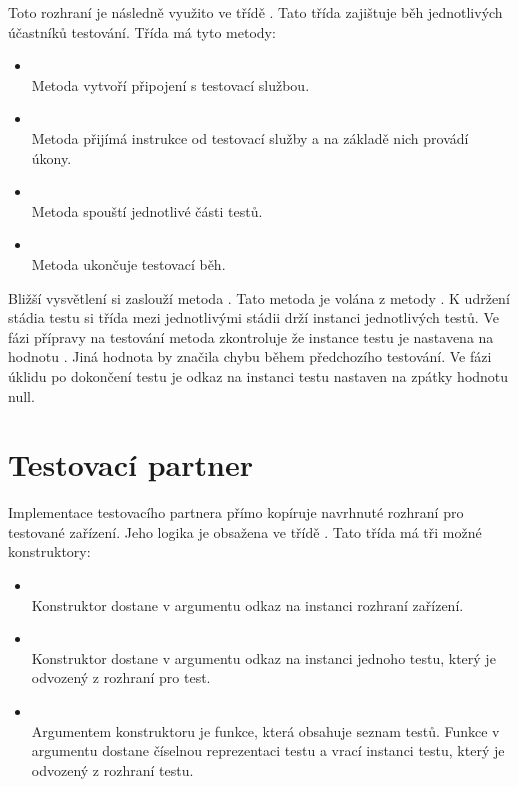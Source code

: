 Toto rozhraní je následně využito ve třídě . Tato třída zajištuje běh jednotlivých účastníků testování. Třída má tyto metody:

\begin{itemize}
    \item {} \\ Metoda vytvoří připojení s testovací službou.
    \item {} \\ Metoda přijímá instrukce od testovací služby a na základě nich provádí úkony.
    \item {} \\ Metoda spouští jednotlivé části testů. 
    \item {} \\ Metoda ukončuje testovací běh.
\end{itemize}

Bližší vysvětlení si zaslouží metoda . Tato metoda je volána z metody . K udržení stádia testu si třída mezi jednotlivými stádii drží instanci jednotlivých testů. Ve fázi přípravy na testování metoda zkontroluje že instance testu je nastavena na hodnotu . Jiná hodnota by značila chybu během předchozího testování. Ve fázi úklidu po dokončení testu je odkaz na instanci testu nastaven na zpátky hodnotu null. 

\section{Testovací partner}
Implementace testovacího partnera přímo kopíruje navrhnuté rozhraní pro testované zařízení. Jeho logika je obsažena ve třídě . Tato třída má tři možné konstruktory:

\begin{itemize} 
    \item {} \\
    Konstruktor dostane v argumentu odkaz na instanci rozhraní zařízení.
    \item {} \\
    Konstruktor dostane v argumentu odkaz na instanci jednoho testu, který je odvozený z rozhraní pro test.
    \item {} \\
    Argumentem konstruktoru je funkce, která obsahuje seznam testů. Funkce v argumentu dostane číselnou reprezentaci testu a vrací instanci testu, který je odvozený z rozhraní testu.
\end{itemize}


